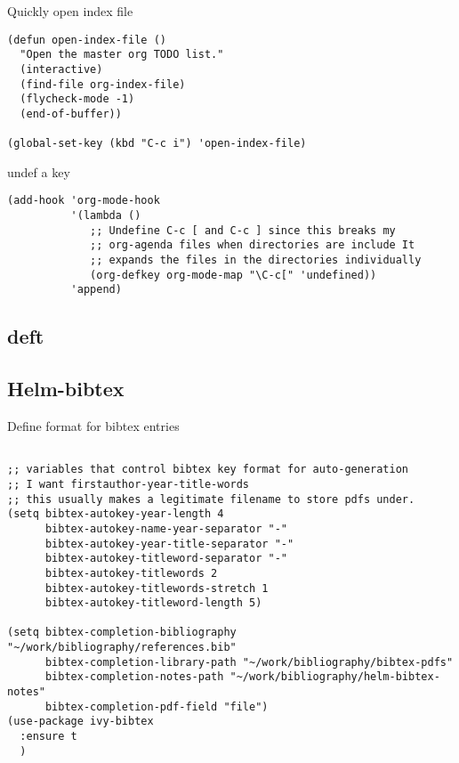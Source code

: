\documentclass[12pt]{article}
\begin{document}
Quickly open index file
\begin{verbatim}
(defun open-index-file ()
  "Open the master org TODO list."
  (interactive)
  (find-file org-index-file)
  (flycheck-mode -1)
  (end-of-buffer))

(global-set-key (kbd "C-c i") 'open-index-file)
\end{verbatim}


undef a key

\begin{verbatim}
(add-hook 'org-mode-hook
          '(lambda ()
             ;; Undefine C-c [ and C-c ] since this breaks my
             ;; org-agenda files when directories are include It
             ;; expands the files in the directories individually
             (org-defkey org-mode-map "\C-c[" 'undefined))
          'append)

\end{verbatim}

\subsection{deft}
\label{sec:org9c5a853}

\subsection{Helm-bibtex}
\label{sec:org6343578}

Define format for bibtex entries

\begin{verbatim}

;; variables that control bibtex key format for auto-generation
;; I want firstauthor-year-title-words
;; this usually makes a legitimate filename to store pdfs under.
(setq bibtex-autokey-year-length 4
      bibtex-autokey-name-year-separator "-"
      bibtex-autokey-year-title-separator "-"
      bibtex-autokey-titleword-separator "-"
      bibtex-autokey-titlewords 2
      bibtex-autokey-titlewords-stretch 1
      bibtex-autokey-titleword-length 5)

(setq bibtex-completion-bibliography "~/work/bibliography/references.bib"
      bibtex-completion-library-path "~/work/bibliography/bibtex-pdfs"
      bibtex-completion-notes-path "~/work/bibliography/helm-bibtex-notes"
      bibtex-completion-pdf-field "file")
(use-package ivy-bibtex
  :ensure t
  )

\end{verbatim}
\end{document}
